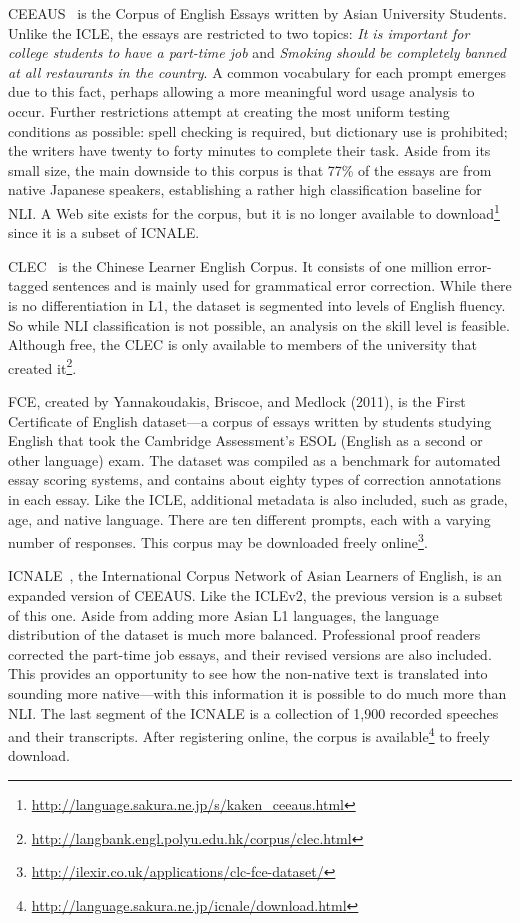 CEEAUS~\cite{ceeaus} is the Corpus of English Essays written by Asian
University Students. Unlike the ICLE, the essays are restricted to two topics:
\emph{It is important for college students to have a part-time job} and
\emph{Smoking should be completely banned at all restaurants in the country}. A
common vocabulary for each prompt emerges due to this fact, perhaps allowing a
more meaningful word usage analysis to occur. Further restrictions attempt at
creating the most uniform testing conditions as possible: spell checking is
required, but dictionary use is prohibited; the writers have twenty to forty
minutes to complete their task. Aside from its small size, the main downside to
this corpus is that 77\% of the essays are from native Japanese speakers,
establishing a rather high classification baseline for NLI\@. A Web site exists
for the corpus, but it is no longer available to
download\footnote{\url{http://language.sakura.ne.jp/s/kaken_ceeaus.html}} since
it is a subset of ICNALE\@.

CLEC~\cite{clec} is the Chinese Learner English Corpus. It consists of one
million error-tagged sentences and is mainly used for grammatical error
correction. While there is no differentiation in L1, the dataset is segmented
into levels of English fluency. So while NLI classification is not possible, an
analysis on the skill level is feasible. Although free, the CLEC is only
available to members of the university that created
it\footnote{\url{http://langbank.engl.polyu.edu.hk/corpus/clec.html}}.

FCE, created by Yannakoudakis, Briscoe, and Medlock (2011), is the First
Certificate of English dataset---a corpus of essays written by students studying
English that took the Cambridge Assessment's ESOL (English as a second or other
language) exam. The dataset was compiled as a benchmark for automated essay
scoring systems, and contains about eighty types of correction annotations in
each essay. Like the ICLE, additional metadata is also included, such as grade,
age, and native language. There are ten different prompts, each with a varying
number of responses. This corpus may be downloaded freely
online\footnote{\url{http://ilexir.co.uk/applications/clc-fce-dataset/}}.

ICNALE~\cite{icnale}, the International Corpus Network of Asian Learners of
English, is an expanded version of CEEAUS\@. Like the ICLEv2, the previous
version is a subset of this one. Aside from adding more Asian L1 languages, the
language distribution of the dataset is much more balanced. Professional proof
readers corrected the part-time job essays, and their revised versions are also
included. This provides an opportunity to see how the non-native text is
translated into sounding more native---with this information it is possible to
do much more than NLI\@. The last segment of the ICNALE is a collection of 1,900
recorded speeches and their transcripts. After registering online, the corpus is
available\footnote{\url{http://language.sakura.ne.jp/icnale/download.html}} to
freely download.

